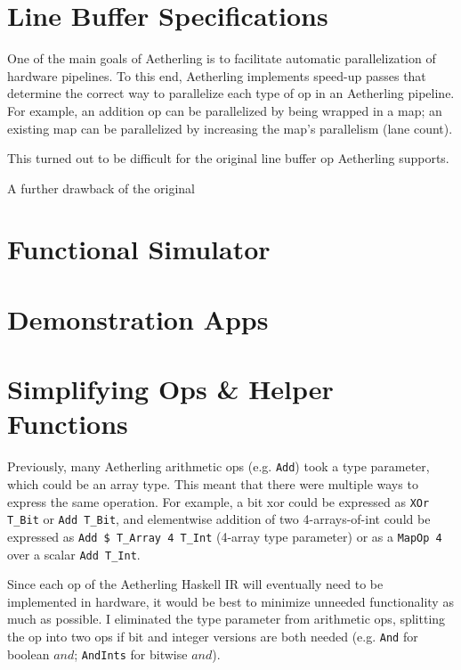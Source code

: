 \documentclass[12pt]{article}
\begin{document}
\section{Line Buffer Specifications}

One of the main goals of Aetherling is to facilitate automatic
parallelization of hardware pipelines. To this end, Aetherling
implements speed-up passes that determine the correct way to
parallelize each type of op in an Aetherling pipeline. For example, an
addition op can be parallelized by being wrapped in a map; an existing
map can be parallelized by increasing the map's parallelism (lane
count).

This turned out to be difficult for the original line buffer op
Aetherling supports. 

A further drawback of the original 

\section{Functional Simulator}

\section{Demonstration Apps}


\section{Simplifying Ops \& Helper Functions}

Previously, many Aetherling arithmetic ops (e.g. \texttt{Add}) took a
type parameter, which could be an array type. This meant that there
were multiple ways to express the same operation. For example, a bit
xor could be expressed as \texttt{XOr T\_Bit} or \texttt{Add T\_Bit},
and elementwise addition of two 4-arrays-of-int could be expressed
as \texttt{Add \$ T\_Array 4 T\_Int} (4-array type parameter) or
as a \texttt{MapOp 4} over a scalar \texttt{Add T\_Int}.

Since each op of the Aetherling Haskell IR will eventually need to be
implemented in hardware, it would be best to minimize unneeded
functionality as much as possible. I eliminated the type parameter
from arithmetic ops, splitting the op into two ops if bit and integer
versions are both needed (e.g. \texttt{And} for boolean $and$;
\texttt{AndInts} for bitwise $and$).
\end{document}
